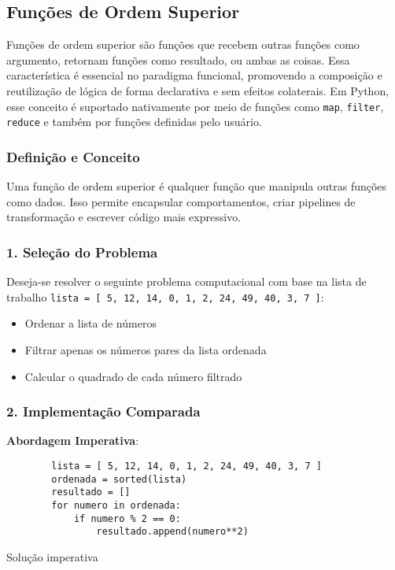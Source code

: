 
\subsection{Funções de Ordem Superior}
Funções de ordem superior são funções que recebem outras funções como argumento, retornam funções como resultado, ou ambas as coisas. Essa característica é essencial no paradigma funcional, promovendo a composição e reutilização de lógica de forma declarativa e sem efeitos colaterais. Em Python, esse conceito é suportado nativamente por meio de funções como \texttt{map}, \texttt{filter}, \texttt{reduce} e também por funções definidas pelo usuário.

\subsubsection{Definição e Conceito}
Uma função de ordem superior é qualquer função que manipula outras funções como dados. Isso permite encapsular comportamentos, criar pipelines de transformação e escrever código mais expressivo.

\subsubsection*{1. Seleção do Problema}

Deseja-se resolver o seguinte problema computacional com base na lista de trabalho \texttt{lista = [ 5, 12, 14, 0, 1, 2, 24, 49, 40, 3, 7 ]}:
\begin{itemize}
    \item Ordenar a lista de números
    \item Filtrar apenas os números pares da lista ordenada
    \item Calcular o quadrado de cada número filtrado
\end{itemize}

\subsubsection*{2. Implementação Comparada}

\textbf{Abordagem Imperativa}:

\begin{listing}[!ht]
    \begin{verbatim}
        lista = [ 5, 12, 14, 0, 1, 2, 24, 49, 40, 3, 7 ]
        ordenada = sorted(lista)
        resultado = []
        for numero in ordenada:
            if numero % 2 == 0:
                resultado.append(numero**2)
    \end{verbatim}
    \caption{Solução imperativa}
    \label{listing:hof_imperativa}
\end{listing}

